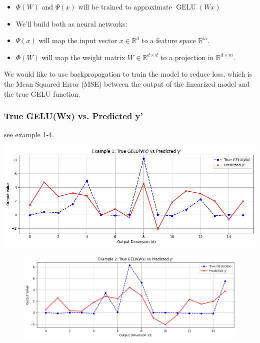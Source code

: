 \documentclass{article}
\begin{document}
\begin{itemize}
  \item $\Phi(W)$ and $\Psi(x)$ will be trained to approximate $\operatorname{GELU}(W x)$
  \item We'll build both as neural networks:
  \item $\Psi(x)$ will map the input vector $x \in \mathbb{R}^d$ to a feature space $\mathbb{R}^m$.
  \item $\Phi(W)$ will map the weight matrix $W \in \mathbb{R}^{d \times d}$ to a projection in $\mathbb{R}^{d \times m}$.
\end{itemize}

We would like to use backpropagation to train the model to reduce loss, which is the Mean Squared Error (MSE) between the output of the linearized model and the true GELU function.

\subsubsection{True GELU(Wx) vs. Predicted y'}
see example 1-4. 
\begin{center}
    \includegraphics[width=1\linewidth]{True_and_Prediction.png}
    \label{fig:enter-label}
\end{center}

\begin{figure}
    \centering
    \includegraphics[width=1\linewidth]{True_and_Prediction2.png}
    \label{fig:enter-label}
\end{figure}
\end{document}
